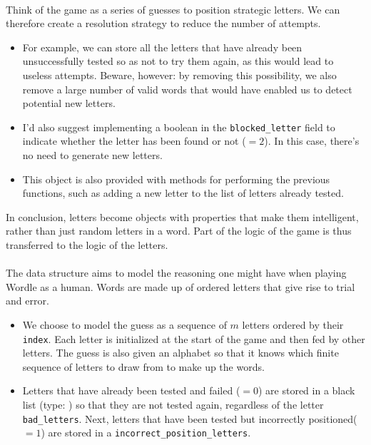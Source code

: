 \documentclass[10pt,a4paper,hidelinks]{article}
\begin{document}
\paragraph{} Think of the game as a series of guesses to position strategic letters. We can therefore create a resolution strategy to reduce the number of attempts.
\begin{itemize}
    \item For example, we can store all the letters that have already been unsuccessfully tested so as not to try them again, as this would lead to useless attempts. Beware, however: by removing this possibility, we also remove a large number of valid words that would have enabled us to detect potential new letters.
    \item I'd also suggest implementing a boolean in the \verb|blocked_letter| field to indicate whether the letter has been found or not ($=2$). In this case, there's no need to generate new letters.
\end{itemize}


\begin{itemize}
    \item This object is also provided with methods for performing the previous functions, such as adding a new letter to the list of letters already tested.
\end{itemize}

In conclusion, letters become objects with properties that make them intelligent, rather than just random letters in a word. Part of the logic of the game is thus transferred to the logic of the letters.


\paragraph{} The data structure aims to model the reasoning one might have when playing Wordle as a human. Words are made up of ordered letters that give rise to trial and error.
\begin{itemize}
    \item We choose to model the guess as a sequence of $m$ letters ordered by their \verb|index|. Each letter is initialized at the start of the game and then fed by other letters. The guess is also given an alphabet so that it knows which finite sequence of letters to draw from to make up the words.
    \item Letters that have already been tested and failed ($=0$) are stored in a black list (type: ) so that they are not tested again, regardless of the letter \verb|bad_letters|. Next, letters that have been tested but incorrectly positioned($=1$) are stored in a  \verb|incorrect_position_letters|.
\end{itemize}

\end{document}
